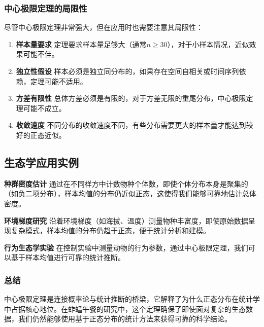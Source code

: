 \documentclass[
  twoside]{book}
\begin{document}
\hypertarget{ux4e2dux5fc3ux6781ux9650ux5b9aux7406ux7684ux5c40ux9650ux6027}{%
\subsubsection{中心极限定理的局限性}\label{ux4e2dux5fc3ux6781ux9650ux5b9aux7406ux7684ux5c40ux9650ux6027}}

尽管中心极限定理非常强大，但在应用时也需要注意其局限性：

\begin{enumerate}
\def\labelenumi{\arabic{enumi}.}
\item
  \textbf{样本量要求}
  定理要求样本量足够大（通常\(n \geq 30\)），对于小样本情况，近似效果可能不佳。
\item
  \textbf{独立性假设}
  样本必须是独立同分布的，如果存在空间自相关或时间序列依赖，定理可能不适用。
\item
  \textbf{方差有限性}
  总体方差必须是有限的，对于方差无限的重尾分布，中心极限定理可能不成立。
\item
  \textbf{收敛速度}
  不同分布的收敛速度不同，有些分布需要更大的样本量才能达到较好的正态近似。
\end{enumerate}

\hypertarget{ux751fux6001ux5b66ux5e94ux7528ux5b9eux4f8b}{%
\subsection{生态学应用实例}\label{ux751fux6001ux5b66ux5e94ux7528ux5b9eux4f8b}}

\textbf{种群密度估计}
通过在不同样方中计数物种个体数，即使个体分布本身是聚集的（如负二项分布），样本均值的分布仍近似正态，这使得我们能够可靠地估计总体密度。

\textbf{环境梯度研究}
沿着环境梯度（如海拔、温度）测量物种丰富度，即使原始数据呈现复杂模式，样本均值的分布仍趋于正态，便于统计分析和建模。

\textbf{行为生态学实验}
在控制实验中测量动物的行为参数，通过中心极限定理，我们可以基于样本均值进行可靠的统计推断。

\hypertarget{ux603bux7ed3-1}{%
\subsubsection{总结}\label{ux603bux7ed3-1}}

中心极限定理是连接概率论与统计推断的桥梁，它解释了为什么正态分布在统计学中占据核心地位。在蚱蜢午餐的研究中，这个定理确保了即使面对复杂的生态数据，我们仍然能够使用基于正态分布的统计方法来获得可靠的科学结论。
\end{document}
